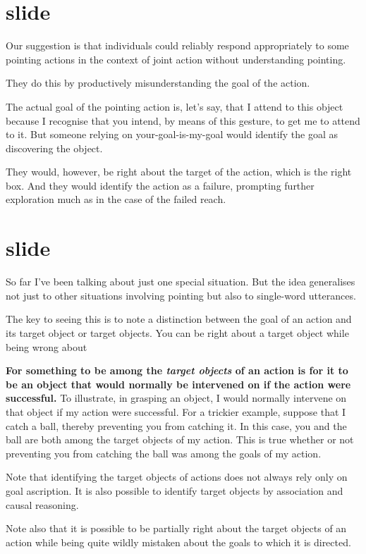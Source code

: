 \documentclass[12pt,\papersize]{extarticle}
\begin{document}
\section{slide}
Our suggestion is that individuals could reliably  respond  appropriately to some pointing actions in the context of joint action without understanding pointing.

They do this by productively misunderstanding the goal of the action.

The actual goal of the pointing action is, let's say, that I attend to this object because I recognise that you intend, by means of this gesture, to get me to attend to it. 
But someone relying on your-goal-is-my-goal would identify the goal as discovering the object.

They would, however, be right about the target of the action, which is the right box.
And they would identify the action as a failure, prompting further exploration much as in the case of the failed reach.



\section{slide}
So far I've been talking about just one special situation.
But the idea generalises not just to other situations involving pointing but also to single-word utterances.

The key to seeing this is to note a distinction between the goal of an action and its target object or target objects. 
You can be right about a target object while being wrong about 

\textbf{For something to be among the \emph{target objects} of an action is for it to be an object that would normally be intervened on if the action were successful.} 
To illustrate, in grasping an object, I would normally intervene on that object if my action were successful.
For a trickier example, suppose that I catch a ball, thereby preventing you from catching it.
In this case, you and the ball are both among the target objects of my action.
This is true whether or not preventing you from catching the ball was among the goals of my action.

Note that identifying the target objects of actions does not always rely only on goal ascription. 
It is also possible to identify target objects by association and causal reasoning.

Note also that it is possible to be partially right about the target objects of an action while being quite wildly mistaken about the goals to which it is directed.
\end{document}
